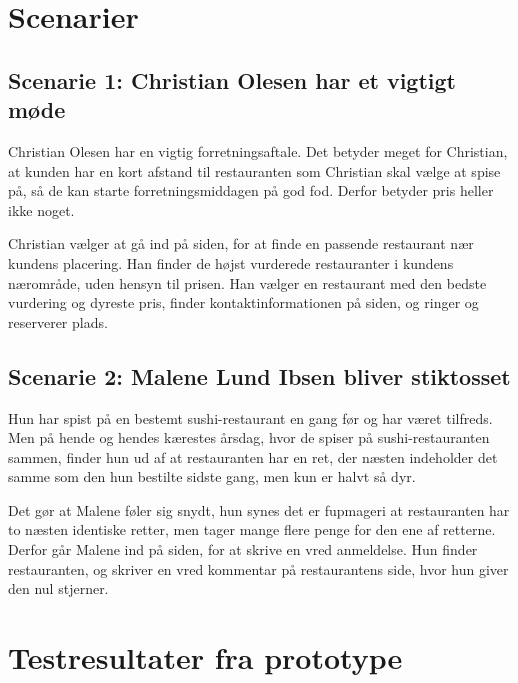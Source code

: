 \documentclass[a4paper, 12pt]{article}
\begin{document}
\section{Scenarier}
\label{sec:Scenarier}

\subsection{Scenarie 1: Christian Olesen har et vigtigt møde}
\label{sub:Scenarie 1: Christian Olesen}
Christian Olesen har en vigtig forretningsaftale. Det betyder meget for
Christian, at kunden har en kort afstand til restauranten som Christian skal
vælge at spise på, så de kan starte forretningsmiddagen på god fod. Derfor
betyder pris heller ikke noget.

Christian vælger at gå ind på siden, for at finde en passende restaurant nær
kundens placering. Han finder de højst vurderede restauranter i kundens
nærområde, uden hensyn til prisen. Han vælger en restaurant med den bedste
vurdering og dyreste pris, finder kontaktinformationen på siden, og ringer og
reserverer plads.

\subsection{Scenarie 2: Malene Lund Ibsen bliver stiktosset}
\label{sub:Scenarie 2: Malene Lund Ibsen}

Hun har spist på en bestemt sushi-restaurant en gang før og har været tilfreds.
Men på hende og hendes kærestes årsdag, hvor de spiser på sushi-restauranten
sammen, finder hun ud af at restauranten har en ret, der næsten indeholder det
samme som den hun bestilte sidste gang, men kun er halvt så dyr.

Det gør at Malene føler sig snydt, hun synes det er fupmageri at restauranten
har to næsten identiske retter, men tager mange flere penge for den ene af
retterne. Derfor går Malene ind på siden, for at skrive en vred anmeldelse.  Hun
finder restauranten, og skriver en vred kommentar på restaurantens side, hvor
hun giver den nul stjerner.
\section{Testresultater fra prototype}
\label{sec:Testresultater fra prototype}
\end{document}
